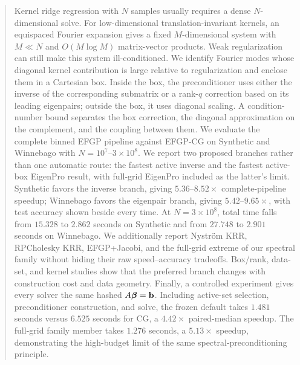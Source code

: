 \begin{abstract}
Kernel ridge regression with \(N\) samples usually requires a dense
\(N\)-dimensional solve. For low-dimensional translation-invariant kernels, an
equispaced Fourier expansion gives a fixed \(M\)-dimensional system with
\(M\ll N\) and \(O(M\log M)\) matrix-vector products. Weak regularization can
still make this system ill-conditioned. We identify Fourier modes whose
diagonal kernel contribution is large relative to regularization and enclose
them in a Cartesian box. Inside the box, the preconditioner uses either the
inverse of the corresponding submatrix or a rank-\(q\) correction based on its
leading eigenpairs; outside the box, it uses diagonal scaling. A
condition-number bound separates the box correction, the diagonal
approximation on the complement, and the coupling between them.  We evaluate
the complete binned EFGP pipeline against EFGP-CG on Synthetic and Winnebago
with \(N=10^7\)--\(3\times10^8\).  We report two proposed branches rather
than one automatic route: the fastest active inverse and the fastest
active-box EigenPro result, with full-grid EigenPro included as the latter's
limit.  Synthetic favors the inverse branch, giving
\(5.36\)--\(8.52\times\) complete-pipeline speedup; Winnebago favors the
eigenpair branch, giving \(5.42\)--\(9.65\times\), with test accuracy shown
beside every time.  At \(N=3\times10^8\), total time falls from \(15.328\) to
\(2.862\) seconds on Synthetic and from \(27.748\) to \(2.901\) seconds on
Winnebago.  We additionally report Nystr\"om KRR, RPCholesky KRR,
EFGP+Jacobi, and the full-grid extreme of our spectral family without hiding
their raw speed--accuracy tradeoffs.  Box/rank, data-set, and kernel studies
show that the preferred branch changes with construction cost and data
geometry.  Finally, a controlled
experiment gives every solver the same hashed \(A\betavec=\bvec\).  Including
active-set selection, preconditioner construction, and solve, the frozen
default takes \(1.481\) seconds versus \(6.525\) seconds for CG, a
\(4.42\times\) paired-median speedup.  The full-grid family member takes
\(1.276\) seconds, a \(5.13\times\) speedup, demonstrating the high-budget
limit of the same spectral-preconditioning principle.







\end{abstract}
